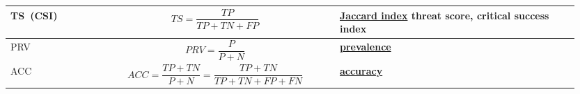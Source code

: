 \documentclass[]{scrreprt}
\begin{document}
\begin{table}[htp]
\begin{tabularx}{\textwidth}{p{0.15\linewidth} p{0.4\linewidth} p{0.4\linewidth}}
		TS~(CSI)&\begin{equation}\label{eq:TS|CSI}
		TS = \frac{TP}{TP+TN+FP}
		\end{equation}&\href{https://en.wikipedia.org/wiki/Jaccard_index\#Jaccard_index_in_binary_classification_confusion_matrices}{Jaccard index} \textbf{threat score}, \textbf{critical success index}~\cite{Wiki:jaccard-index}\\
		\hline
		PRV&\begin{equation}\label{eq:PRV}
		PRV = \frac{P}{P+N}
		\end{equation}&\href{https://en.wikipedia.org/wiki/Prevalence}{\textbf{prevalence}}~\cite{Wiki:prevalence}\\
		\hline
		ACC&\begin{equation}\label{eq:ACC}
		ACC = \frac{TP+TN}{P+N} = \frac{TP+TN}{TP+TN+FP+FN}
		\end{equation}&\href{https://en.wikipedia.org/wiki/Accuracy_and_precision}{\textbf{accuracy}}~\cite{Wiki:accuracy-precision}\\
		\hline
	\end{tabularx}
	\normalsize
\end{table}
%
\end{document}
